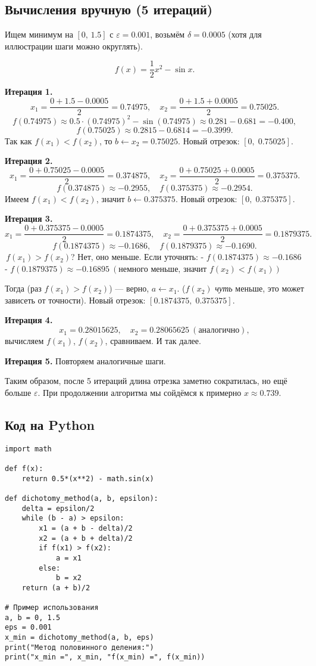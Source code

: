 \documentclass[12pt]{article}
\begin{document}
\subsection{Вычисления вручную (5 итераций)}

Ищем минимум на $[0,\,1.5]$ с $\varepsilon=0.001$, возьмём $\delta = 0.0005$ (хотя для иллюстрации шаги можно округлять).

\[
f(x) = \frac12 x^2 - \sin x.
\]

\textbf{Итерация 1.}  
\[
x_1 = \frac{0 + 1.5 - 0.0005}{2} = 0.74975, 
\quad
x_2 = \frac{0 + 1.5 + 0.0005}{2} = 0.75025.
\]
\[
f(0.74975)\approx 0.5\cdot(0.74975)^2 - \sin(0.74975)\approx 0.281 - 0.681=-0.400,
\]
\[
f(0.75025)\approx 0.2815 - 0.6814=-0.3999.
\]
Так как $f(x_1)<f(x_2)$, то $b\leftarrow x_2=0.75025$. Новый отрезок: $[0,\;0.75025]$.

\textbf{Итерация 2.}  
\[
x_1=\frac{0+0.75025-0.0005}{2}=0.374875,\quad
x_2=\frac{0+0.75025+0.0005}{2}=0.375375.
\]
\[
f(0.374875)\approx -0.2955,\quad f(0.375375)\approx -0.2954.
\]
Имеем $f(x_1)<f(x_2)$, значит $b\leftarrow0.375375$. Новый отрезок: $[0,\;0.375375]$.

\textbf{Итерация 3.}  
\[
x_1=\frac{0 + 0.375375 - 0.0005}{2}=0.1874375,\quad
x_2=\frac{0 + 0.375375 + 0.0005}{2}=0.1879375.
\]
\[
f(0.1874375)\approx -0.1686,\quad
f(0.1879375)\approx -0.1690.
\]
$\,f(x_1) > f(x_2)$? Нет, оно меньше. Если уточнять: 
- $f(0.1874375)\approx -0.1686$
- $f(0.1879375)\approx -0.16895\ (\text{немного меньше, значит }f(x_2)<f(x_1))$  

Тогда (раз $f(x_1) > f(x_2)$) — верно, $a\leftarrow x_1$.  
(\(f(x_2)\) \emph{чуть} меньше, это может зависеть от точности).  
Новый отрезок: $[0.1874375,\;0.375375]$.

\textbf{Итерация 4.}  
\[
x_1=0.28015625,\quad x_2=0.28065625 \ (\text{аналогично}),
\]
вычисляем $f(x_1)$, $f(x_2)$, сравниваем. И так далее.

\textbf{Итерация 5.}  
Повторяем аналогичные шаги.  

Таким образом, после 5 итераций длина отрезка заметно сократилась, но ещё больше $\varepsilon$. При продолжении алгоритма мы сойдёмся к примерно $x\approx0.739$.  

\subsection{Код на Python}

\begin{verbatim}
import math

def f(x):
    return 0.5*(x**2) - math.sin(x)

def dichotomy_method(a, b, epsilon):
    delta = epsilon/2
    while (b - a) > epsilon:
        x1 = (a + b - delta)/2
        x2 = (a + b + delta)/2
        if f(x1) > f(x2):
            a = x1
        else:
            b = x2
    return (a + b)/2

# Пример использования
a, b = 0, 1.5
eps = 0.001
x_min = dichotomy_method(a, b, eps)
print("Метод половинного деления:")
print("x_min =", x_min, "f(x_min) =", f(x_min))
\end{verbatim}
\end{document}
